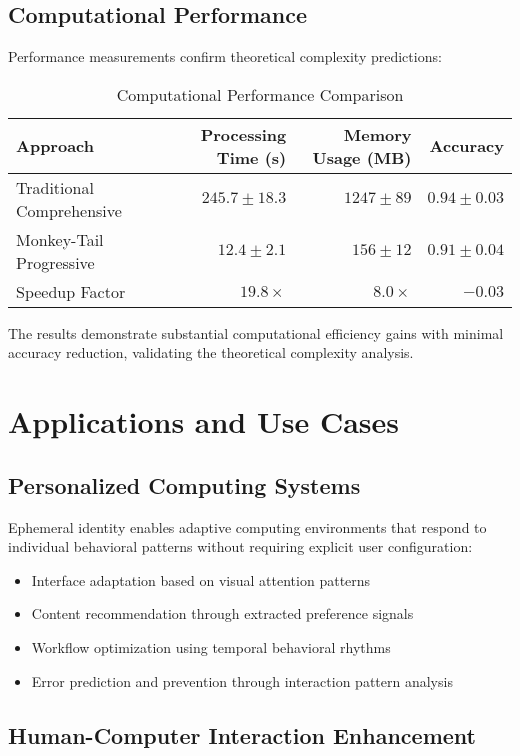 \documentclass[12pt,a4paper]{article}
\begin{document}
\subsection{Computational Performance}

Performance measurements confirm theoretical complexity predictions:

\begin{table}[H]
\centering
\caption{Computational Performance Comparison}
\begin{tabular}{@{}lrrr@{}}
\toprule
Approach & Processing Time (s) & Memory Usage (MB) & Accuracy \\
\midrule
Traditional Comprehensive & $245.7 \pm 18.3$ & $1247 \pm 89$ & $0.94 \pm 0.03$ \\
Monkey-Tail Progressive & $12.4 \pm 2.1$ & $156 \pm 12$ & $0.91 \pm 0.04$ \\
Speedup Factor & $19.8\times$ & $8.0\times$ & $-0.03$ \\
\bottomrule
\end{tabular}
\end{table}

The results demonstrate substantial computational efficiency gains with minimal accuracy reduction, validating the theoretical complexity analysis.

\section{Applications and Use Cases}

\subsection{Personalized Computing Systems}

Ephemeral identity enables adaptive computing environments that respond to individual behavioral patterns without requiring explicit user configuration:

\begin{itemize}
\item Interface adaptation based on visual attention patterns
\item Content recommendation through extracted preference signals
\item Workflow optimization using temporal behavioral rhythms
\item Error prediction and prevention through interaction pattern analysis
\end{itemize}

\subsection{Human-Computer Interaction Enhancement}
\end{document}
